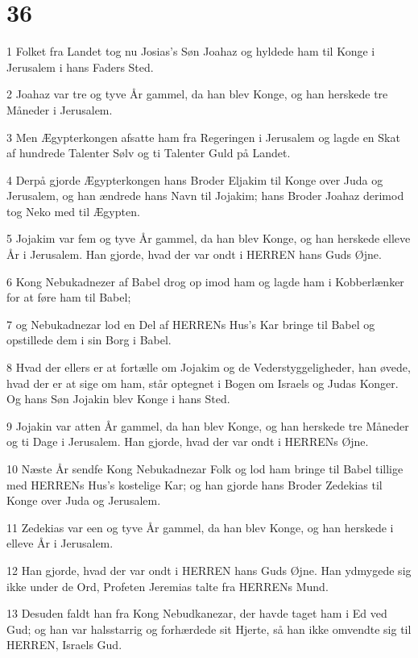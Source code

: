 \chapter{36}

\par 1 Folket fra Landet tog nu Josias's Søn Joahaz og hyldede ham til Konge i Jerusalem i hans Faders Sted.
\par 2 Joahaz var tre og tyve År gammel, da han blev Konge, og han herskede tre Måneder i Jerusalem.
\par 3 Men Ægypterkongen afsatte ham fra Regeringen i Jerusalem og lagde en Skat af hundrede Talenter Sølv og ti Talenter Guld på Landet.
\par 4 Derpå gjorde Ægypterkongen hans Broder Eljakim til Konge over Juda og Jerusalem, og han ændrede hans Navn til Jojakim; hans Broder Joahaz derimod tog Neko med til Ægypten.
\par 5 Jojakim var fem og tyve År gammel, da han blev Konge, og han herskede elleve År i Jerusalem. Han gjorde, hvad der var ondt i HERREN hans Guds Øjne.
\par 6 Kong Nebukadnezer af Babel drog op imod ham og lagde ham i Kobberlænker for at føre ham til Babel;
\par 7 og Nebukadnezar lod en Del af HERRENs Hus's Kar bringe til Babel og opstillede dem i sin Borg i Babel.
\par 8 Hvad der ellers er at fortælle om Jojakim og de Vederstyggeligheder, han øvede, hvad der er at sige om ham, står optegnet i Bogen om Israels og Judas Konger. Og hans Søn Jojakin blev Konge i hans Sted.
\par 9 Jojakin var atten År gammel, da han blev Konge, og han herskede tre Måneder og ti Dage i Jerusalem. Han gjorde, hvad der var ondt i HERRENs Øjne.
\par 10 Næste År sendfe Kong Nebukadnezar Folk og lod ham bringe til Babel tillige med HERRENs Hus's kostelige Kar; og han gjorde hans Broder Zedekias til Konge over Juda og Jerusalem.
\par 11 Zedekias var een og tyve År gammel, da han blev Konge, og han herskede i elleve År i Jerusalem.
\par 12 Han gjorde, hvad der var ondt i HERREN hans Guds Øjne. Han ydmygede sig ikke under de Ord, Profeten Jeremias talte fra HERRENs Mund.
\par 13 Desuden faldt han fra Kong Nebudkanezar, der havde taget ham i Ed ved Gud; og han var halsstarrig og forhærdede sit Hjerte, så han ikke omvendte sig til HERREN, Israels Gud.
